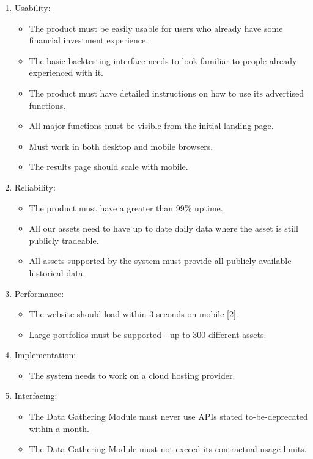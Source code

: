 \documentclass[main.tex]{subfiles}
\begin{document}
\begin{enumerate}
   \item Usability:
   \begin{itemize}
     \item The product must be easily usable for users who already have some financial investment experience.
     \item The basic backtesting interface needs to look familiar to people already experienced with it.
     \item The product must have detailed instructions on how to use its advertised functions.
     \item All major functions must be visible from the initial landing page.
     \item Must work in both desktop and mobile browsers.
     \item The results page should scale with mobile.
   \end{itemize}
   \item Reliability:
      \begin{itemize}
     \item The product must have a greater than 99\% uptime.
     \item All our assets need to have up to date daily data where the asset is still publicly tradeable.
     \item All assets supported by the system must provide all publicly available historical data.
   \end{itemize}
    \item Performance:
      \begin{itemize}
     \item The website should load within 3 seconds on mobile [2].
     \item Large portfolios must be supported - up to 300 different assets.
   \end{itemize}
    \item Implementation:
      \begin{itemize}
     \item The system needs to work on a cloud hosting provider.
   \end{itemize}
    \item Interfacing:
      \begin{itemize}
     \item The Data Gathering Module must never use APIs stated to-be-deprecated within a month.
     \item The Data Gathering Module must not exceed its contractual usage limits.

\end{itemize}
\end{enumerate}
\end{document}
